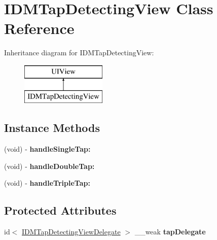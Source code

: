 \hypertarget{interface_i_d_m_tap_detecting_view}{}\section{I\+D\+M\+Tap\+Detecting\+View Class Reference}
\label{interface_i_d_m_tap_detecting_view}
Inheritance diagram for I\+D\+M\+Tap\+Detecting\+View\+:\begin{figure}[H]
\begin{center}
\leavevmode
\includegraphics[height=2.000000cm]{interface_i_d_m_tap_detecting_view}
\end{center}
\end{figure}
\subsection*{Instance Methods}
\begin{DoxyCompactItemize}
\item 
\hypertarget{interface_i_d_m_tap_detecting_view_aef53d3c0a0f27086680a8c287a70fa06}{}(void) -\/ {\bfseries handle\+Single\+Tap\+:}\label{interface_i_d_m_tap_detecting_view_aef53d3c0a0f27086680a8c287a70fa06}

\item 
\hypertarget{interface_i_d_m_tap_detecting_view_aea4fd439a7f283f97a40353e111231cc}{}(void) -\/ {\bfseries handle\+Double\+Tap\+:}\label{interface_i_d_m_tap_detecting_view_aea4fd439a7f283f97a40353e111231cc}

\item 
\hypertarget{interface_i_d_m_tap_detecting_view_a969ce268bdba08ca510778c2566f6c8c}{}(void) -\/ {\bfseries handle\+Triple\+Tap\+:}\label{interface_i_d_m_tap_detecting_view_a969ce268bdba08ca510778c2566f6c8c}

\end{DoxyCompactItemize}
\subsection*{Protected Attributes}
\begin{DoxyCompactItemize}
\item 
\hypertarget{interface_i_d_m_tap_detecting_view_a51970715dc1087bd0192ae3bc9e7f652}{}id$<$ \hyperlink{protocol_i_d_m_tap_detecting_view_delegate-p}{I\+D\+M\+Tap\+Detecting\+View\+Delegate} $>$ \+\_\+\+\_\+weak {\bfseries tap\+Delegate}\label{interface_i_d_m_tap_detecting_view_a51970715dc1087bd0192ae3bc9e7f652}

\end{DoxyCompactItemize}
